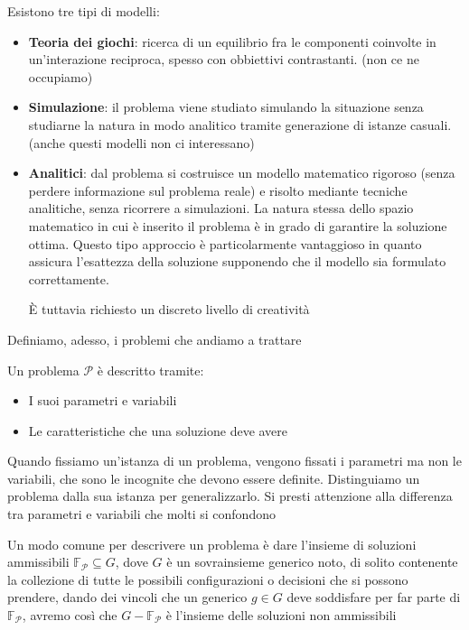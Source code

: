 \documentclass{report}
\begin{document}
Esistono tre tipi di modelli:
\begin{itemize}
\item \textbf{Teoria dei giochi}: ricerca di un equilibrio fra le componenti coinvolte in un'interazione reciproca, spesso con obbiettivi contrastanti. (non ce ne occupiamo)
\item \textbf{Simulazione}: il problema viene studiato simulando la situazione senza studiarne la natura in modo analitico tramite generazione di istanze casuali. (anche questi modelli non ci interessano)
\item \textbf{Analitici}: dal problema si costruisce un modello matematico rigoroso (senza perdere informazione sul problema reale) e risolto mediante tecniche analitiche, senza ricorrere a simulazioni. La natura stessa dello spazio matematico in cui è inserito il problema è in grado di garantire la soluzione ottima. Questo tipo approccio è particolarmente vantaggioso in quanto assicura l’esattezza della soluzione supponendo che il modello sia formulato correttamente. 

È tuttavia richiesto un discreto livello di creatività
\end{itemize}

Definiamo, adesso, i problemi che andiamo a trattare

Un problema $ \mathcal{P} $ è descritto tramite:
\begin{itemize}
  \item I suoi parametri e variabili
  \item Le caratteristiche che una soluzione deve avere
\end{itemize}

Quando fissiamo un'istanza di un problema, vengono fissati i parametri ma non le variabili, che sono le incognite che devono essere definite. Distinguiamo un problema dalla sua istanza per generalizzarlo. Si presti attenzione alla differenza tra parametri e variabili che molti si confondono

Un modo comune per descrivere un problema è dare l'insieme di soluzioni ammissibili $ \mathbb{F}_{\mathcal{P}} \subseteq G $, dove $G$ è un sovrainsieme generico noto, di solito contenente la collezione di tutte le possibili configurazioni o decisioni che si possono prendere, dando dei vincoli che un generico $ g \in G $ deve soddisfare per far parte di $\mathbb{F}_{\mathcal{P}}$, avremo così che $G - \mathbb{F}_{\mathcal{P}}$ è l'insieme delle soluzioni non ammissibili 
\end{document}
